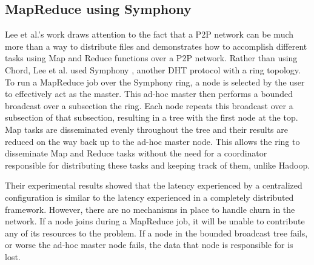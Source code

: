 \documentclass[10pt, conference, compsocconf]{IEEEtran}
\begin{document}

\subsection{MapReduce using Symphony}

Lee et al.'s work \cite{leemap} draws attention to the fact that a P2P network can be much more than a way to distribute files and demonstrates how to accomplish different tasks using Map and Reduce functions over a P2P network.  Rather than using Chord, Lee et al. used Symphony \cite{symphony}, another DHT protocol with a ring topology.  To run a MapReduce job over the Symphony ring, a node is selected by the user to effectively act as the master.  This ad-hoc master then performs a bounded broadcast over a subsection the ring.  Each node repeats this broadcast over a subsection of that subsection, resulting in a tree with the first node at the top.  Map tasks are disseminated evenly throughout the tree and their results are reduced on the way back up to the ad-hoc master node.  This allows the ring to disseminate Map and Reduce tasks without the need for a coordinator responsible for distributing these tasks and keeping track of them, unlike Hadoop.
 
Their experimental results showed that the latency experienced by a centralized configuration is similar to the latency experienced in a completely distributed framework.  However, there are no mechanisms in place to handle churn in the network.  If a node joins during a MapReduce job, it will be unable to contribute any of its resources to the problem. If a node in the bounded broadcast tree fails, or worse the ad-hoc master node fails, the data that node is responsible for is lost. 
\end{document}
